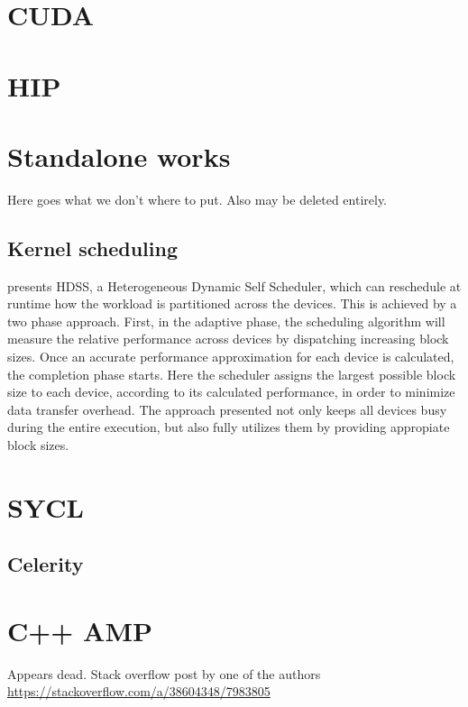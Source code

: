 \cite{openmp_vs_openacc}

\section{CUDA}

\section{HIP}

\section{Standalone works}

Here goes what we don't where to put. Also may be deleted entirely.

\subsection{Kernel scheduling}

\cite{dynamic_self_scheduling} presents HDSS, a Heterogeneous Dynamic Self Scheduler, which can reschedule at runtime how the workload is partitioned across the devices. This is achieved by a two phase approach. First, in the adaptive phase, the scheduling algorithm will measure the relative performance across devices by dispatching increasing block sizes. Once an accurate performance approximation for each device is calculated, the completion phase starts. Here the scheduler assigns the largest possible block size to each device, according to its calculated performance, in order to minimize data transfer overhead. The approach presented not only keeps all devices busy during the entire execution, but also fully utilizes them by providing appropiate block sizes. 



\section{SYCL}
\subsection{Celerity}

\section{C++ AMP}
Appears dead. Stack overflow post by one of the authors \url{https://stackoverflow.com/a/38604348/7983805}